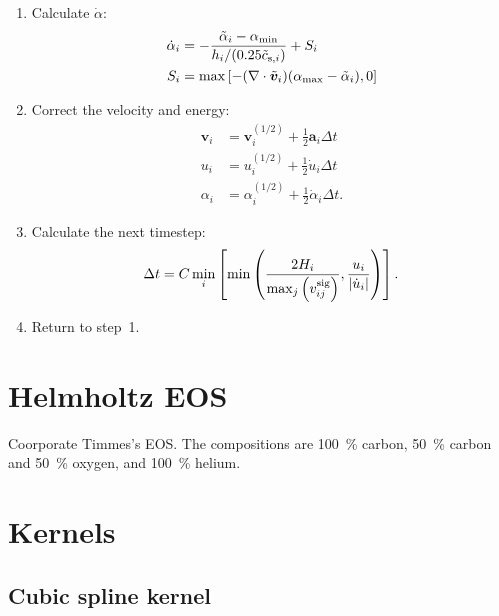 \documentclass[fleqn,dvipdfmx]{article}
\begin{document}
\begin{enumerate}
\item Calculate $\dot{\alpha}$:
  \begin{align}
    \dot{\alpha}_i &= - \frac{\tilde{\alpha}_i - \alpha_{\rm
        min}}{h_i/(0.25\tilde{c}_{{\rm s},i})} + S_i \\ 
    S_i &= \max \left[ -(\nabla \cdot \tilde{\bm{v}}_i)(\alpha_{\rm
        max}-\tilde{\alpha}_i), 0 \right]
  \end{align}

\item Correct the velocity and energy:
  \begin{align}
    \bm{v}_i &= \bm{v}^{(1/2)}_i + \frac{1}{2} \bm{a}_i \Delta t \\
    u_i &= u^{(1/2)}_i + \frac{1}{2} \dot{u}_i \Delta t \\
    \alpha_i &= \alpha^{(1/2)}_i + \frac{1}{2} \dot{\alpha}_i \Delta
    t.
  \end{align}

\item Calculate the next timestep:
  \begin{align}
    \Delta t = C \min_i \left[ \min \left( \frac{2H_i}{\max_j \left(
        v_{ij}^{\rm sig} \right) }, \frac{u_i}{|\dot{u}_i|} \right)
      \right].
  \end{align}

\item Return to step~1.
\end{enumerate}

\section{Helmholtz EOS}

Coorporate Timmes's EOS. The compositions are 100~\% carbon, 50~\%
carbon and 50~\% oxygen, and 100~\% helium.

\appendix

\section{Kernels}
\label{sec:kernels}

\subsection{Cubic spline kernel}
\end{document}
